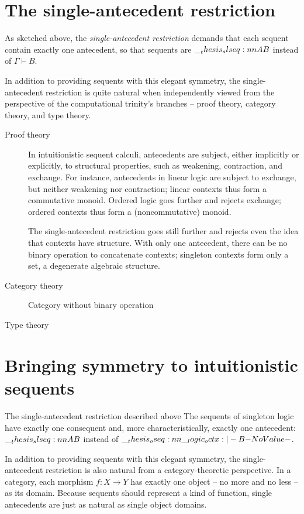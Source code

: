 \section{The single-antecedent restriction}\label{sec:singleton-logic:restriction}

As sketched above, the \emph{single-antecedent restriction} demands that each sequent contain exactly one antecedent, so that sequents are $\slseq{A |- B}$ instead of $\Gamma \vdash B$.

In addition to providing sequents with this elegant symmetry, the single-antecedent restriction is quite natural when independently viewed from the perspective of the computational trinity's\autocite{Harper:??} branches -- proof theory, category theory, and type theory.
%
\begin{description}
\item[Proof theory]
  In intuitionistic sequent calculi, antecedents are subject, either implicitly or explicitly, to structural properties, such as weakening, contraction, and exchange.
  For instance, antecedents in linear logic are subject to exchange, but neither weakening nor contraction; linear contexts thus form a commutative monoid.
  Ordered logic goes further and rejects exchange; ordered contexts thus form a (noncommutative) monoid.

  The single-antecedent restriction goes still further and rejects even the idea that contexts have structure.
  With only one antecedent, there can be no binary operation to concatenate contexts; singleton contexts form only a set, a degenerate algebraic structure.

\item[Category theory]
  Category without binary operation

\item[Type theory]
\end{description}

\section{Bringing symmetry to intuitionistic sequents}\label{sec:singleton-logic:derive}

The single-antecedent restriction described above
The sequents of singleton logic have exactly one consequent and, more characteristically, exactly one antecedent: $\slseq{A |- B}$ instead of $\oseq{\octx |- B}$.

In addition to providing sequents with this elegant symmetry, the single-antecedent restriction is also natural from a category-theoretic perspective.
In a category, each morphism $f\colon X \rightarrow Y$ has exactly one object -- no more and no less -- as its domain.
Because sequents should represent a kind of function, single antecedents are just as natural as single object domains.

